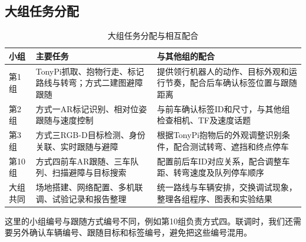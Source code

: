 \begin{table}[H]
\subsection{大组任务分配}
\begin{table}[H]\centering\small
\begin{tabularx}{\linewidth}{p{24mm}YY}\toprule
小组 & 主要任务 & 与其他组的配合\\\midrule
第1组 & TonyPi抓取、抱物行走、标记路线与转弯；方式二建图避障跟随 & 提供领行机器人的动作、目标外观和运行节奏，配合后车确认标签位置与跟随距离\\
第2组 & 方式一AR标记识别、相对位姿跟随与速度控制 & 与前车确认标签ID和尺寸，与其他组检查相机、TF及速度话题\\
第3组 & 方式三RGB-D目标检测、身份关联、实时跟随与避障 & 根据TonyPi抱物后的外观调整识别条件，配合测试转弯、遮挡和终点停车\\
第10组 & 方式四前车AR跟随、三车队列、扫描避障与目标搜索 & 配置前后车ID对应关系，配合调整车距、转弯速度及队列停车顺序\\
大组共同 & 场地搭建、网络配置、多机联调、试验记录和报告整理 & 统一路线与车辆安排，交换调试现象，整理各组程序、图表和实验结果\\\bottomrule
\end{tabularx}\caption{大组任务分配与相互配合}
\end{table}
这里的小组编号与跟随方式编号不同，例如第10组负责方式四。联调时，我们还需要另外确认车辆编号、跟随目标和标签编号，避免把这些编号混用。


\end{table}
